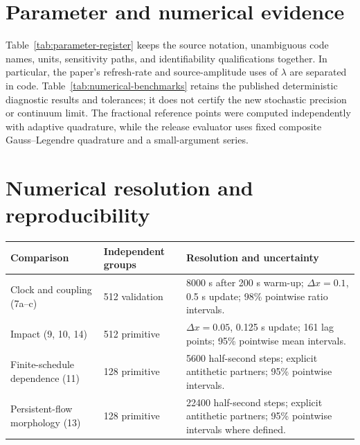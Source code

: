 \documentclass[11pt]{article}
\begin{document}
\begin{landscape}

\end{landscape}

\section{Parameter and numerical evidence}

Table~\ref{tab:parameter-register} keeps the source notation, unambiguous code names, units, sensitivity paths, and identifiability qualifications together. In particular, the paper's refresh-rate and source-amplitude uses of \(\lambda\) are separated in code. Table~\ref{tab:numerical-benchmarks} retains the published deterministic diagnostic results and tolerances; it does not certify the new stochastic precision or continuum limit. The fractional reference points were computed independently with adaptive quadrature, while the release evaluator uses fixed composite Gauss--Legendre quadrature and a small-argument series.

\section{Numerical resolution and reproducibility}

\begin{center}
\small
\begin{tabularx}{\textwidth}{@{}p{2.7cm}p{2.5cm}X@{}}
\toprule
Comparison & Independent groups & Resolution and uncertainty \\
\midrule
Clock and coupling (7a--c) & 512 validation & 8000 s after 200 s warm-up; $\Delta x=0.1$, 0.5 s update; 98\% pointwise ratio intervals. \\
Impact (9, 10, 14) & 512 primitive & $\Delta x=0.05$, 0.125 s update; 161 lag points; 95\% pointwise mean intervals. \\
Finite-schedule dependence (11) & 128 primitive & 5600 half-second steps; explicit antithetic partners; 95\% pointwise intervals. \\
Persistent-flow morphology (13) & 128 primitive & 22400 half-second steps; explicit antithetic partners; 95\% pointwise intervals where defined. \\
\bottomrule
\end{tabularx}
\end{center}
\end{document}
